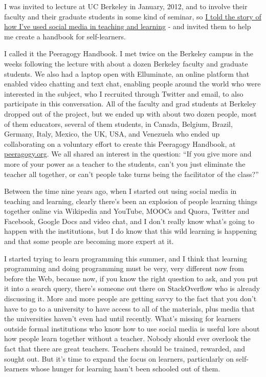 I was invited to lecture at UC Berkeley in January, 2012, and to involve
their faculty and their graduate students in some kind of seminar, so
\href{http://vimeo.com/35685124}{I told the story of how I've used
social media in teaching and learning} - and invited them to help me
create a handbook for self-learners.

I called it the Peeragogy Handbook. I met twice on the Berkeley campus
in the weeks following the lecture with about a dozen Berkeley faculty
and graduate students. We also had a laptop open with Elluminate, an
online platform that enabled video chatting and text chat, enabling
people around the world who were interested in the subject, who I
recruited through Twitter and email, to also participate in this
conversation. All of the faculty and grad students at Berkeley dropped
out of the project, but we ended up with about two dozen people, most of
them educators, several of them students, in Canada, Belgium, Brazil,
Germany, Italy, Mexico, the UK, USA, and Venezuela who ended up
collaborating on a voluntary effort to create this Peeragogy Handbook,
at \href{http://peeragogy.org/}{peeragogy.org}. We all shared an
interest in the question: ``If you give more and more of your power as a
teacher to the students, can't you just eliminate the teacher all
together, or can't people take turns being the facilitator of the
class?''

Between the time nine years ago, when I started out using social media
in teaching and learning, clearly there's been an explosion of people
learning things together online via Wikipedia and YouTube, MOOCs and
Quora, Twitter and Facebook, Google Docs and video chat, and I don't
really know what's going to happen with the institutions, but I do know
that this wild learning is happening and that some people are becoming
more expert at it.

I started trying to learn programming this summer, and I think that
learning programming and doing programming must be very, very different
now from before the Web, because now, if you know
the right question to
ask, and you put it into a search query, there's someone out there on
StackOverflow who is already discussing it. More and more people are
getting savvy to the fact that you don't have to go to a university to
have access to all of the materials, plus media that the universities
haven't even had until recently. What's missing for learners outside
formal institutions who know how to use social media is useful lore
about how people learn together without a teacher. Nobody should ever
overlook the fact that there are great teachers. Teachers should be
trained, rewarded, and sought out. But it's time to expand the focus on
learners, particularly on self-learners whose hunger for learning hasn't
been schooled out of them.


